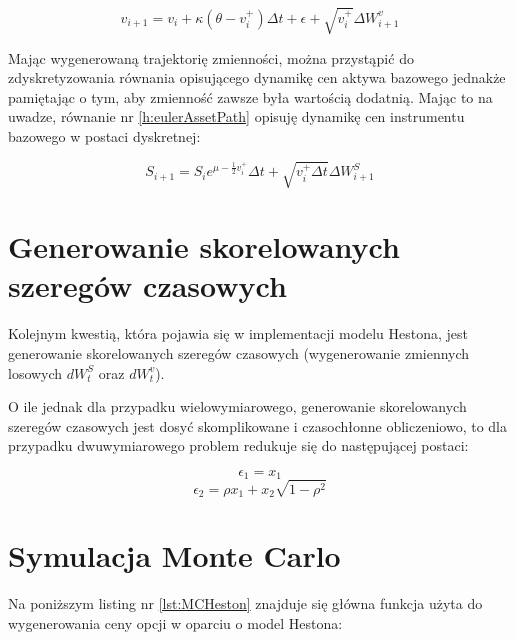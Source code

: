 \documentclass{pracamgr}
\begin{document}
\begin{equation}\label{h:eulerNonZero}
v_{i+1}  = v_i + \kappa (\theta - v_i^+) \Delta t + \epsilon +  \sqrt{v_i^+} \Delta W^{v}_{i+1}
\end{equation}

Mając wygenerowaną trajektorię zmienności, można przystąpić do zdyskretyzowania równania opisującego 
dynamikę cen aktywa bazowego jednakże pamiętając o tym, aby zmienność zawsze była wartością dodatnią. 
Mając to na uwadze, równanie nr \ref{h:eulerAssetPath} opisuję dynamikę cen instrumentu bazowego w postaci dyskretnej:

\begin{equation}\label{h:eulerAssetPath}
S_{i+1} = S_i e^{\mu - \frac{1}{2} v_i^+} \Delta t + \sqrt{v_i^+ \Delta t}  \Delta W_{i+1}^S
\end{equation}
  
\section{Generowanie skorelowanych szeregów czasowych}

Kolejnym kwestią, która pojawia się w implementacji modelu Hestona, jest generowanie skorelowanych 
szeregów czasowych (wygenerowanie zmiennych losowych $dW^S_t$ oraz $dW^v_t$). 


O ile jednak dla przypadku wielowymiarowego, generowanie skorelowanych szeregów czasowych jest dosyć
skomplikowane i czasochłonne obliczeniowo, to dla przypadku dwuwymiarowego problem redukuje się do 
następującej postaci:

\begin{equation}
  \epsilon_1 = x_1
\end{equation}
\begin{equation}
  \epsilon_2 = \rho x_1 + x_2 \sqrt{1-\rho^2}
\end{equation}



\section{Symulacja Monte Carlo}


Na poniższym listing nr \ref{lst:MCHeston} znajduje się główna funkcja użyta do wygenerowania ceny 
opcji w oparciu o model Hestona:

\end{document}
